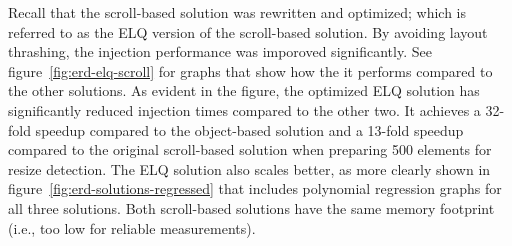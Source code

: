 \documentclass[a4paper,11pt]{kth-mag}
\begin{document}
        Recall that the scroll-based solution was rewritten and optimized; which is referred to as the \gls{ELQ} version of the scroll-based solution.
        By avoiding \gls{layout thrashing}, the injection performance was imporoved significantly.
        See figure~\ref{fig:erd-elq-scroll} for graphs that show how the it performs compared to the other solutions.
        As evident in the figure, the optimized \gls{ELQ} solution has significantly reduced injection times compared to the other two.
        It achieves a 32-fold speedup compared to the object-based solution and a 13-fold speedup compared to the original scroll-based solution when preparing 500 \glspl{element} for resize detection.
        The \gls{ELQ} solution also scales better, as more clearly shown in figure~\ref{fig:erd-solutions-regressed} that includes polynomial regression graphs for all three solutions.
        Both scroll-based solutions have the same memory footprint (i.e., too low for reliable measurements).
\end{document}
